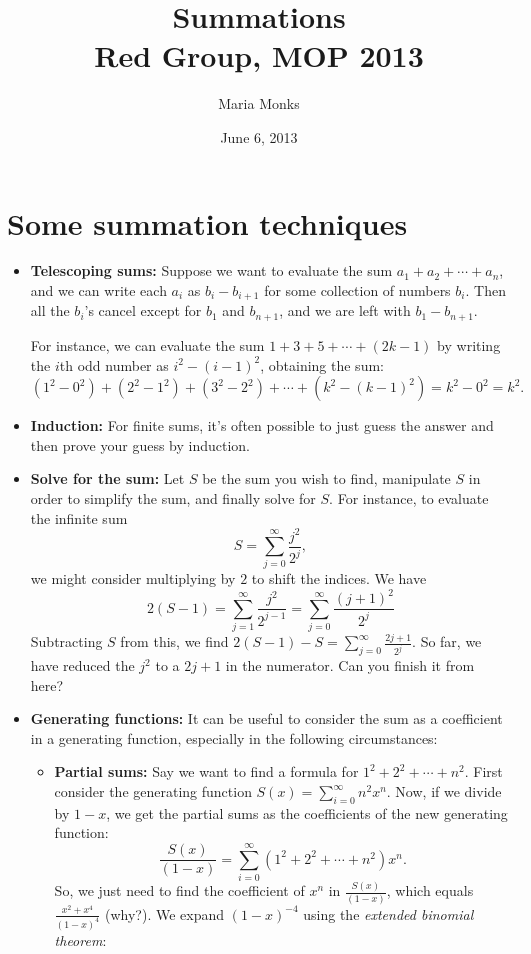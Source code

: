 \documentclass[12pt]{article}
\title{Summations \\ \small{Red Group, MOP 2013}}
\author{Maria Monks}
\date{June 6, 2013}
\begin{document}
\maketitle{}

\section*{Some summation techniques}

\begin{itemize}
\item \textbf{Telescoping sums:}
Suppose we want to evaluate the sum $a_1+a_2+\cdots+a_n$, and we can write each $a_i$ as $b_i-b_{i+1}$ for some collection of numbers $b_i$.  Then all the $b_i$'s cancel except for $b_1$ and $b_{n+1}$, and we are left with $b_1-b_{n+1}$.

For instance, we can evaluate the sum $1+3+5+\cdots+(2k-1)$ by writing the $i$th odd number as $i^2-(i-1)^2$, obtaining the sum: $$(1^2-0^2)+(2^2-1^2)+(3^2-2^2)+\cdots+(k^2-(k-1)^2)=k^2-0^2=k^2.$$


\item \textbf{Induction:} For finite sums, it's often possible to just guess the answer and then prove your guess by induction.

\item \textbf{Solve for the sum:} Let $S$ be the sum you wish to find, manipulate $S$ in order to simplify the sum, and finally solve for $S$.  For instance, to evaluate the infinite sum $$S=\sum_{j=0}^\infty\frac{j^2}{2^j},$$ we might consider multiplying by $2$ to shift the indices.  We have  $$2(S-1)=\sum_{j=1}^\infty \frac{j^2}{2^{j-1}}=\sum_{j=0}^\infty \frac{(j+1)^2}{2^j}$$  Subtracting $S$ from this, we find $2(S-1)-S=\sum_{j=0}^{\infty} \frac{2j+1}{2^{j}}$.  So far, we have reduced the $j^2$ to a $2j+1$ in the numerator.  Can you finish it from here?

\item \textbf{Generating functions:}  It can be useful to consider the sum as a coefficient in a generating function, especially in the following circumstances:
\begin{itemize}
\item \textbf{Partial sums:} Say we want to find a formula for $1^2+2^2+\cdots+n^2$.  First consider the generating function $S(x)=\sum_{i=0}^\infty n^2x^n$.  Now, if we divide by $1-x$, we get the partial sums as the coefficients of the new generating function: $$\frac{S(x)}{(1-x)}=\sum_{i=0}^\infty (1^2+2^2+\cdots+n^2)x^n.$$  So, we just need to find the coefficient of $x^n$ in $\frac{S(x)}{(1-x)}$, which equals $\frac{x^2+x^4}{(1-x)^4}$ (why?).  We expand $(1-x)^{-4}$ using the \textit{extended binomial theorem}:


\end{itemize}
\end{itemize}
\end{document}
